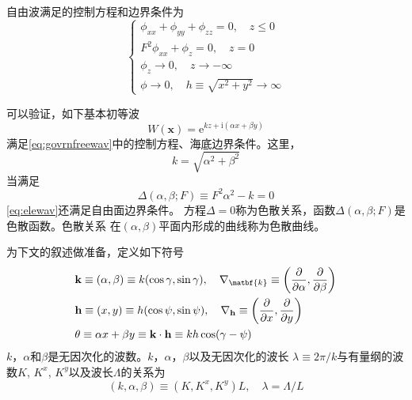 自由波满足的控制方程和边界条件为
\begin{equation}\label{eq:govrnfreewav}
\left\{ 
\begin{array}{l}
  \phi_{xx}+\phi_{yy}+\phi_{zz}=0,\quad z\le0 \\
  F^2\phi_{xx}+\phi_z=0,\quad z=0\\
  \phi_z\rightarrow0, \quad z\rightarrow -\infty\\
  \phi\rightarrow0, \quad h\equiv\sqrt{x^2+y^2}\rightarrow\infty
\end{array} \right.
\end{equation}

可以验证，如下基本初等波
\begin{equation}
  W(\mathbf{x})=\mathrm{e}^{kz+\mathrm{i}(\alpha x+\beta y)}
  \label{eq:elewav}
\end{equation}
满足\eqref{eq:govrnfreewav}中的控制方程、海底边界条件。这里，
\begin{equation}
  k=\sqrt{\alpha^2+\beta^2}
  \label{eq:wavnumber}
\end{equation}
当满足
\begin{equation}
  \Delta(\alpha,\beta;F)\equiv F^2\alpha^2-k=0
  \label{eq:disper}
\end{equation}
\eqref{eq:elewav}还满足自由面边界条件。
方程$\Delta=0$称为色散关系，函数$\Delta(\alpha,\beta;F)$是色散函数。色散关系
在$(\alpha,\beta)$平面内形成的曲线称为色散曲线。

为下文的叙述做准备，定义如下符号
\begin{eqnarray}
  &\mathbf{k}\equiv(\alpha,\beta)\equiv k(\cos\gamma,\sin\gamma),\quad \nabla_{\matbf{k}}\equiv\left(\frac{\partial}{\partial\alpha},\frac{\partial}{\partial\beta}\right) \label{eq:kbfdef} \\
  &\mathbf{h}\equiv(x,y)\equiv h(\cos\psi,\sin\psi),\quad
  \nabla_{\mathbf{h}}\equiv\left(\frac{\partial}{\partial x},\frac{\partial}{\partial y}\right) \label{eq:hbfdef}\\
  &\theta\equiv\alpha x+\beta y\equiv\mathbf{k}\cdot\mathbf{h}\equiv kh\cos(\gamma-\psi) \label{eq:thetadef}
\end{eqnarray}
$k$，$\alpha$和$\beta$是无因次化的波数。$k$，$\alpha$，$\beta$以及无因次化的波长
$\lambda\equiv 2\pi/k$与有量纲的波数$K$, $K^x$, $K^y$以及波长$\Lambda$的关系为
\begin{equation}
  (k,\alpha,\beta)\equiv(K,K^x,K^y)L,\quad \lambda=\Lambda/L
  \label{eq:klambdim}
\end{equation}


